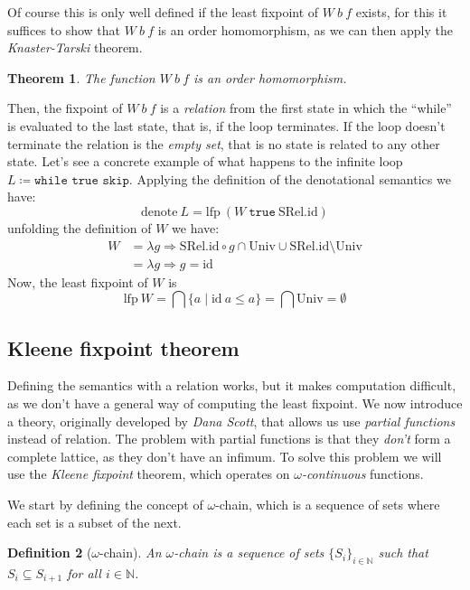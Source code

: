 \documentclass[
  a4paper, 
  10pt, 
  parskip=half, 
  DIV=20,
  toc=bibliography,
  usegeometry,
]{scrartcl}
\newtheorem{theorem}{Theorem}[section]
\newtheorem{definition}[theorem]{Definition}
\newcommand{\funfont}[1]{\text{#1}}
\renewcommand{\mapsto}{\Rightarrow}
\begin{document}
Of course this is only well defined if the least fixpoint of \(W \ b \ f\) exists,
for this it suffices to show that \(W \ b \ f\) is an order homomorphism, as we 
can then apply the \emph{Knaster-Tarski} theorem.

\begin{theorem}
  The function \(W \ b \ f\) is an order homomorphism.
\end{theorem}

Then, the fixpoint of \(W \ b \ f\)
is a \emph{relation} from the first state in which the \enquote{while} is
evaluated to the last state, that is, if the loop terminates. If the loop
doesn't terminate the relation is the \emph{empty set}, that is no state
is related to any other state.
Let's see a concrete example of what happens to the infinite loop 
\(L \coloneqq \texttt{while true {skip}}\).
Applying the definition of the denotational semantics we have:
\[
  \funfont{denote} \ L = \funfont{lfp} \ (W \ \texttt{true} \ \funfont{SRel.id})
\]
unfolding the definition of \(W\) we have:
\begin{align*}
  W &= \lambda g \mapsto \funfont{SRel.id} \circ g \cap \funfont{Univ} \cup \funfont{SRel.id} \setminus \funfont{Univ} \\
    &= \lambda g \mapsto g = \funfont{id}
\end{align*}
Now, the least fixpoint of \(W\) is
\[
  \funfont{lfp} \ W = \bigcap \{a \mid \funfont{id} \ a \leq a\} = 
    \bigcap \funfont{Univ} = \emptyset
\]

\subsection{Kleene fixpoint theorem}

Defining the semantics with a relation works, but it makes computation difficult,
as we don't have a general way of computing the least fixpoint. We now 
introduce a theory, originally developed by \emph{Dana Scott}, that allows us
use \emph{partial functions} instead of relation. The problem with
partial functions is that they \emph{don't} form a complete lattice, as they
don't have an infimum. To solve this problem we will use the \emph{Kleene fixpoint}
theorem, which operates on \emph{\(\omega\)-continuous} functions.

We start by defining the concept of \(\omega\)-chain, which is a sequence of
sets where each set is a subset of the next.

\begin{definition}[\(\omega\)-chain]
  An \(\omega\)-chain is a sequence of sets \(\{S_i\}_{i \in \mathbb{N}}\) such that
  \(S_i \subseteq S_{i+1}\) for all \(i \in \mathbb{N}\).
\end{definition}
\end{document}

